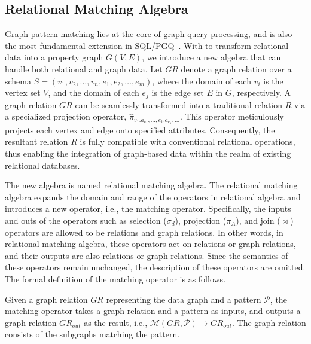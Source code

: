 \subsection{Relational Matching Algebra}
\label{sec:graph-relational-algebra}
Graph pattern matching lies at the core of graph query processing, and is also the most fundamental extension in SQL/PGQ~\cite{sqlpgq}.
With \rgmapping to transform relational data into a property graph $G(V, E)$, we introduce a new algebra that can handle both relational and graph data.
Let $GR$ denote a graph relation over a schema $S = (v_1, v_2, \ldots, v_n, e_1, e_2, \ldots, e_m)$, where the domain of each $v_i$
is the vertex set $V$, and the domain of each $e_j$ is the edge set $E$ in $G$, respectively.
A graph relation \(GR\) can be seamlessly transformed into a traditional relation \(R\) via a specialized projection operator, \(\widehat{\pi}_{v_1.a_{v_1}, \ldots, e_1.a_{e_1}, \ldots}\). This operator meticulously projects each vertex and edge onto specified attributes. Consequently, the resultant relation \(R\) is fully compatible with conventional relational operations, thus enabling the integration of graph-based data within the realm of existing relational databases. %


The new algebra is named relational matching algebra.
The relational matching algebra expands the domain and range of the operators in relational algebra and introduces a new operator, i.e., the matching operator.
Specifically, the inputs and outs of the operators such as selection ($\sigma_d$), projection ($\pi_A$), and join ($\Join$) operators are allowed to be relations and graph relations.
In other words, in relational matching algebra, these operators act on relations or graph relations, and their outputs are also relations or graph relations.
Since the semantics of these operators remain unchanged, the description of these operators are omitted.
The formal definition of the matching operator is as follows.

\begin{definition}
    Given a graph relation $GR$ representing the data graph and a pattern $\mathcal{P}$, the matching operator takes a graph relation and a pattern as inputs, and outputs a graph relation $GR_{out}$ as the result, i.e., $\mathcal{M}(GR, \mathcal{P}) \rightarrow GR_{out}$.
    The graph relation consists of the subgraphs matching the pattern.
\end{definition}


